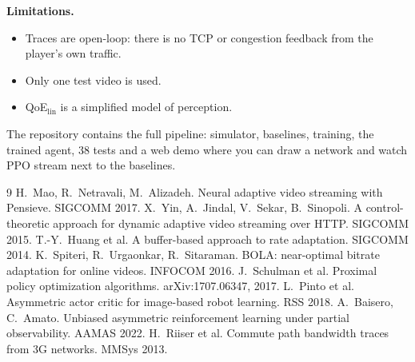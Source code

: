 \documentclass[10pt,twocolumn]{article}
\begin{document}
\textbf{Limitations.}
\begin{itemize}
  \item Traces are open-loop: there is no TCP or congestion feedback from the player's own traffic.
  \item Only one test video is used.
  \item QoE$_\text{lin}$ is a simplified model of perception.
\end{itemize}
The repository contains the full pipeline: simulator, baselines, training, the trained agent, 38 tests
and a web demo where you can draw a network and watch PPO stream next to the baselines.

\vspace{-0.4em}
\begin{thebibliography}{9}\footnotesize
\setlength{\itemsep}{0pt}
 H.~Mao, R.~Netravali, M.~Alizadeh. Neural adaptive video streaming with Pensieve. SIGCOMM 2017.
 X.~Yin, A.~Jindal, V.~Sekar, B.~Sinopoli. A control-theoretic approach for dynamic adaptive video streaming over HTTP. SIGCOMM 2015.
 T.-Y.~Huang et al. A buffer-based approach to rate adaptation. SIGCOMM 2014.
 K.~Spiteri, R.~Urgaonkar, R.~Sitaraman. BOLA: near-optimal bitrate adaptation for online videos. INFOCOM 2016.
 J.~Schulman et al. Proximal policy optimization algorithms. arXiv:1707.06347, 2017.
 L.~Pinto et al. Asymmetric actor critic for image-based robot learning. RSS 2018.
 A.~Baisero, C.~Amato. Unbiased asymmetric reinforcement learning under partial observability. AAMAS 2022.
 H.~Riiser et al. Commute path bandwidth traces from 3G networks. MMSys 2013.
\end{thebibliography}
\end{document}

